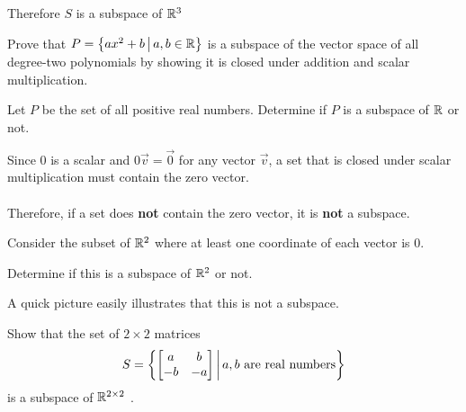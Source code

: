 \begin{applicationActivities}
\begin{activity}{15}
Therefore \(S\) is a subspace of \(\mathbb{R}^3\)
\end{activity}

\begin{activity}{10}
  Prove that \(P=\left\{ax^2+b\,\middle|\,a,b \in \mathbb{R}\right\}\) is a subspace
  of the vector space of all degree-two polynomials by showing it is closed under addition and scalar multiplication.
\end{activity}

\begin{activity}{10}
Let \(P\) be the set of all positive real numbers.  Determine if \(P\) is a subspace of \(\mathbb{R}\) or not.
\end{activity}

\begin{remark}
Since \(0\) is a scalar and \(0\vec{v}=\vec{0}\) for any vector \(\vec{v}\), a set that is closed under scalar multiplication must contain the zero vector.
\ \\
\ \\
Therefore, if a set does {\bf not} contain the zero vector, it is {\bf not} a subspace.
\end{remark}

\begin{activity}{10}
  Consider the subset of \(\mathbb{R}^2\) where at least one coordinate of
  each vector is \(0\).
  \begin{center}
  \end{center}

Determine if this is a subspace of \(\mathbb{R}^2\) or not.

  \begin{instructorNote}
   A quick picture easily illustrates that this is not a subspace. 
  \end{instructorNote}
\end{activity}



\begin{activity}{5}
  Show that the set of \(2\times 2\) matrices
  \[S=
    \left\{ \begin{bmatrix}a&b\\-b&-a\end{bmatrix}\,\middle|\,a,b\text{ are real numbers}\right\}
  \]
  is a subspace of \(\mathbb{R}^{2\times 2}\) .
\end{activity}


\end{applicationActivities}

